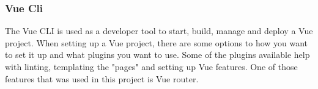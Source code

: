 \subsubsection{Vue Cli}
The Vue CLI\cite{VUECLI} is used as a developer tool to start, build, manage and deploy a Vue project. When setting up a Vue project, there are some options to how you want to set it up and what plugins you want to use. Some of the plugins available help with linting, templating the "pages" and setting up Vue features. One of those features that was used in this project is Vue router.